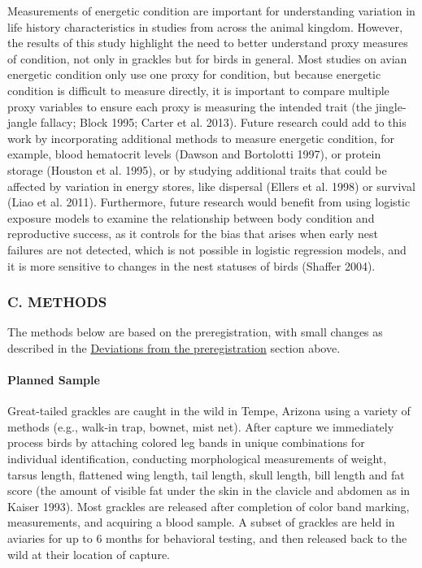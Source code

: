 \documentclass[
]{article}
\begin{document}
Measurements of energetic condition are important for understanding
variation in life history characteristics in studies from across the
animal kingdom. However, the results of this study highlight the need to
better understand proxy measures of condition, not only in grackles but
for birds in general. Most studies on avian energetic condition only use
one proxy for condition, but because energetic condition is difficult to
measure directly, it is important to compare multiple proxy variables to
ensure each proxy is measuring the intended trait (the jingle-jangle
fallacy; Block 1995; Carter et al. 2013). Future research could add to
this work by incorporating additional methods to measure energetic
condition, for example, blood hematocrit levels (Dawson and Bortolotti
1997), or protein storage (Houston et al. 1995), or by studying
additional traits that could be affected by variation in energy stores,
like dispersal (Ellers et al. 1998) or survival (Liao et al. 2011).
Furthermore, future research would benefit from using logistic exposure
models to examine the relationship between body condition and
reproductive success, as it controls for the bias that arises when early
nest failures are not detected, which is not possible in logistic
regression models, and it is more sensitive to changes in the nest
statuses of birds (Shaffer 2004).

\hypertarget{c.-methods}{%
\subsubsection{C. METHODS}\label{c.-methods}}

The methods below are based on the preregistration, with small changes
as described in the
\protect\hyperlink{deviations-from-the-preregistration}{Deviations from
the preregistration} section above.

\hypertarget{planned-sample}{%
\paragraph{\texorpdfstring{\textbf{Planned
Sample}}{Planned Sample}}\label{planned-sample}}

Great-tailed grackles are caught in the wild in Tempe, Arizona using a
variety of methods (e.g., walk-in trap, bownet, mist net). After capture
we immediately process birds by attaching colored leg bands in unique
combinations for individual identification, conducting morphological
measurements of weight, tarsus length, flattened wing length, tail
length, skull length, bill length and fat score (the amount of visible
fat under the skin in the clavicle and abdomen as in Kaiser 1993). Most
grackles are released after completion of color band marking,
measurements, and acquiring a blood sample. A subset of grackles are
held in aviaries for up to 6 months for behavioral testing, and then
released back to the wild at their location of capture.
\end{document}
